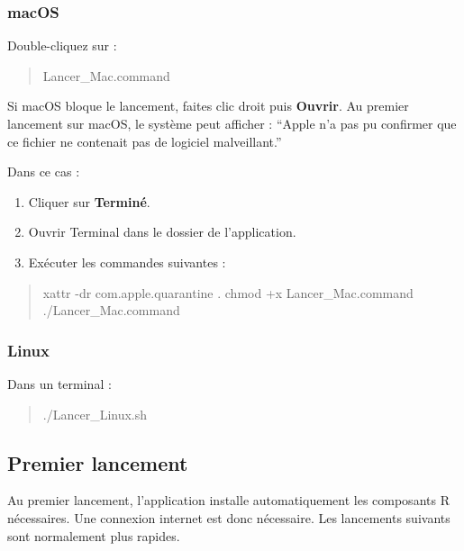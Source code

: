\documentclass[11pt,a4paper]{article}
\newenvironment{Shaded}{\begin{quote}}{\end{quote}}
\newcommand{\NormalTok}[1]{#1}
\newcommand{\ExtensionTok}[1]{#1}
\begin{document}
\subsubsection{macOS}\label{macos}

Double-cliquez sur :

\begin{Shaded}
\begin{Highlighting}[]
\NormalTok{Lancer\_Mac.command}
\end{Highlighting}
\end{Shaded}
Si macOS bloque le lancement, faites clic droit puis \textbf{Ouvrir}.
Au premier lancement sur macOS, le système peut afficher : ``Apple n'a
pas pu confirmer que ce fichier ne contenait pas de logiciel
malveillant.''

\noindent Dans ce cas :

\begin{enumerate}
\item Cliquer sur \textbf{Terminé}.
\item Ouvrir Terminal dans le dossier de l'application.
\item Exécuter les commandes suivantes :
\end{enumerate}

\begin{Shaded}
\begin{Highlighting}[]
\NormalTok{xattr -dr com.apple.quarantine .}
\NormalTok{chmod +x Lancer\_Mac.command}
\NormalTok{./Lancer\_Mac.command}
\end{Highlighting}
\end{Shaded}

\subsubsection{Linux}\label{linux}

Dans un terminal :

\begin{Shaded}
\begin{Highlighting}[]
\ExtensionTok{./Lancer\_Linux.sh}
\end{Highlighting}
\end{Shaded}

\subsection{Premier lancement}\label{premier-lancement}

Au premier lancement, l'application installe automatiquement les
composants R nécessaires. Une connexion internet est donc nécessaire. Les lancements suivants sont normalement plus rapides.
\end{document}
